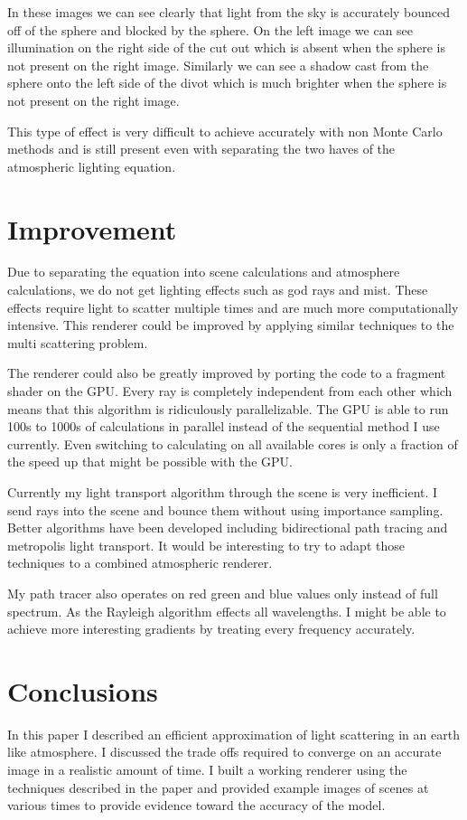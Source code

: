 \documentclass[12pt, letterpaper]{article}
\begin{document}
In these images we can see clearly that light from the sky is accurately bounced
off of the sphere and blocked by the sphere. On the left image we can see
illumination on the right side of the cut out which is absent when the sphere is
not present on the right image. Similarly we can see a shadow cast from the
sphere onto the left side of the divot which is much brighter when the sphere is
not present on the right image.

This type of effect is very difficult to achieve accurately with non Monte Carlo
methods and is still present even with separating the two haves of the
atmospheric lighting equation.

\section{Improvement}

Due to separating the equation into scene calculations and atmosphere
calculations, we do not get lighting effects such as god rays and mist. These
effects require light to scatter multiple times and are much more
computationally intensive. This renderer could be improved by applying similar
techniques to the multi scattering problem.

The renderer could also be greatly improved by porting the code to a fragment
shader on the GPU. Every ray is completely independent from each other which
means that this algorithm is ridiculously parallelizable. The GPU is able to run
100s to 1000s of calculations in parallel instead of the sequential method I use
currently. Even switching to calculating on all available cores is only a
fraction of the speed up that might be possible with the GPU.

Currently my light transport algorithm through the scene is very inefficient. I
send rays into the scene and bounce them without using importance sampling.
Better algorithms have been developed including bidirectional path tracing and
metropolis light transport. It would be interesting to try to adapt those
techniques to a combined atmospheric renderer.

My path tracer also operates on red green and blue values only instead of full
spectrum. As the Rayleigh algorithm effects all wavelengths. I might be able to
achieve more interesting gradients by treating every frequency accurately.

\section{Conclusions}

In this paper I described an efficient approximation of light scattering in an
earth like atmosphere. I discussed the trade offs required to converge on an
accurate image in a realistic amount of time. I built a working renderer using
the techniques described in the paper and provided example images of scenes at
various times to provide evidence toward the accuracy of the model.

\clearpage



\end{document}

